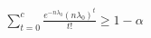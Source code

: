 \documentclass[preview]{standalone}
\begin{document}
\begin{align*}
\sum_{t=0}^c \frac{e^{-n\lambda_0}(n\lambda_0)^t}{t!} \geq 1-\alpha
\end{align*}
\end{document}
